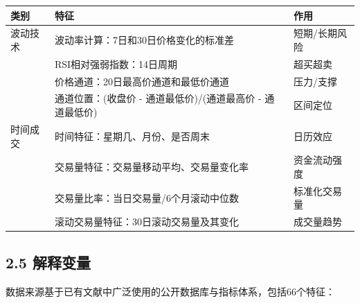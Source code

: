 \documentclass[
  letterpaper,
  DIV=11,
  numbers=noendperiod]{scrartcl}
\begin{document}
\begin{longtable}[]{@{}
  >{\raggedright\arraybackslash}p{}
  >{\raggedright\arraybackslash}p{}
  >{\raggedright\arraybackslash}p{}@{}}
\toprule\noalign{}
\begin{minipage}[b]{\linewidth}\raggedright
类别
\end{minipage} & \begin{minipage}[b]{\linewidth}\raggedright
特征
\end{minipage} & \begin{minipage}[b]{\linewidth}\raggedright
作用
\end{minipage} \\
\midrule\noalign{}
\endhead
\bottomrule\noalign{}
\endlastfoot
波动技术 & 波动率计算：7日和30日价格变化的标准差 & 短期/长期风险 \\
& RSI相对强弱指数：14日周期 & 超买超卖 \\
& 价格通道：20日最高价通道和最低价通道 & 压力/支撑 \\
& 通道位置：(收盘价 - 通道最低价)/(通道最高价 - 通道最低价) &
区间定位 \\
时间成交 & 时间特征：星期几、月份、是否周末 & 日历效应 \\
& 交易量特征：交易量移动平均、交易量变化率 & 资金流动强度 \\
& 交易量比率：当日交易量/6个月滚动中位数 & 标准化交易量 \\
& 滚动交易量特征：30日滚动交易量及其变化 & 成交量趋势 \\
\end{longtable}

\subsection{2.5 解释变量}\label{ux89e3ux91caux53d8ux91cf}

数据来源基于已有文献中广泛使用的公开数据库与指标体系，包括66个特征：
\end{document}
